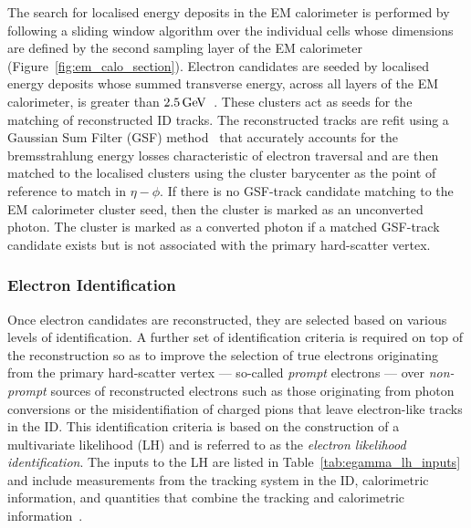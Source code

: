 The search for localised energy deposits in the EM calorimeter is performed
by following a sliding window algorithm over the individual cells whose dimensions are
defined by the second sampling layer of the EM calorimeter (Figure~\ref{fig:em_calo_section}).
Electron candidates are seeded by localised energy deposits whose summed transverse energy,
across all layers of the EM calorimeter, is greater than $2.5\,\text{Ge\kern -0.1em V}$~\cite{Aad:2019tso}.
These clusters act as seeds for the matching of reconstructed ID tracks.
The reconstructed tracks are refit using a Gaussian Sum Filter (GSF) method~\cite{ATLAS-CONF-2012-047} 
that accurately accounts for the bremsstrahlung energy losses characteristic of
electron traversal and are then matched to the localised clusters using
the cluster barycenter as the point of reference to match in $\eta-\phi$.
If there is no GSF-track candidate matching to the EM calorimeter cluster seed, then
the cluster is marked as an unconverted photon. The cluster is marked as a
converted photon if a matched GSF-track candidate exists but is not associated
with the primary hard-scatter vertex.

\subsubsection{Electron Identification}
\label{sec:electron_id}

Once electron candidates are reconstructed, they are selected based on various
levels of identification.
A further set of identification criteria is required on top of the reconstruction
so as to improve the selection of true electrons originating from the primary hard-scatter
vertex --- so-called \textit{prompt} electrons --- over \textit{non-prompt} sources
of reconstructed electrons such as those originating from photon conversions or the misidentifiation
of charged pions that leave electron-like tracks in the ID.
This identification criteria is based on the construction of a multivariate likelihood (LH) and
is referred to as the \textit{electron likelihood identification}.
The inputs to the LH are listed in Table~\ref{tab:egamma_lh_inputs} and include measurements from the tracking system in the ID,
calorimetric information, and quantities that combine the tracking and calorimetric information~\cite{Aad:2019tso}.

